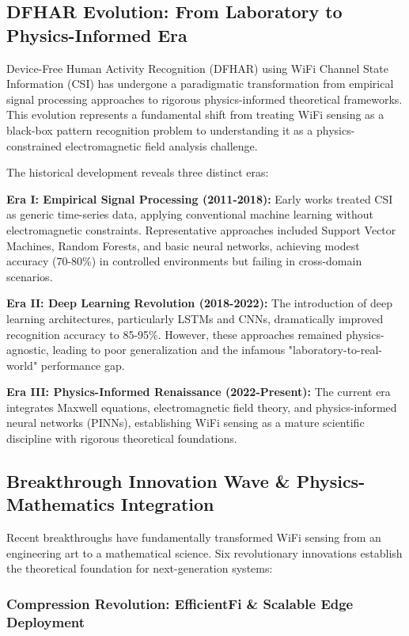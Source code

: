 \documentclass[journal]{IEEEtran}
\begin{document}
\subsection{DFHAR Evolution: From Laboratory to Physics-Informed Era}

Device-Free Human Activity Recognition (DFHAR) using WiFi Channel State Information (CSI) has undergone a paradigmatic transformation from empirical signal processing approaches to rigorous physics-informed theoretical frameworks. This evolution represents a fundamental shift from treating WiFi sensing as a black-box pattern recognition problem to understanding it as a physics-constrained electromagnetic field analysis challenge.

The historical development reveals three distinct eras:

\textbf{Era I: Empirical Signal Processing (2011-2018):} Early works treated CSI as generic time-series data, applying conventional machine learning without electromagnetic constraints. Representative approaches included Support Vector Machines, Random Forests, and basic neural networks, achieving modest accuracy (70-80\%) in controlled environments but failing in cross-domain scenarios.

\textbf{Era II: Deep Learning Revolution (2018-2022):} The introduction of deep learning architectures, particularly LSTMs and CNNs, dramatically improved recognition accuracy to 85-95\%. However, these approaches remained physics-agnostic, leading to poor generalization and the infamous "laboratory-to-real-world" performance gap.

\textbf{Era III: Physics-Informed Renaissance (2022-Present):} The current era integrates Maxwell equations, electromagnetic field theory, and physics-informed neural networks (PINNs), establishing WiFi sensing as a mature scientific discipline with rigorous theoretical foundations.

\subsection{Breakthrough Innovation Wave \& Physics-Mathematics Integration}

Recent breakthroughs have fundamentally transformed WiFi sensing from an engineering art to a mathematical science. Six revolutionary innovations establish the theoretical foundation for next-generation systems:

\subsubsection{Compression Revolution: EfficientFi \& Scalable Edge Deployment}
\end{document}
